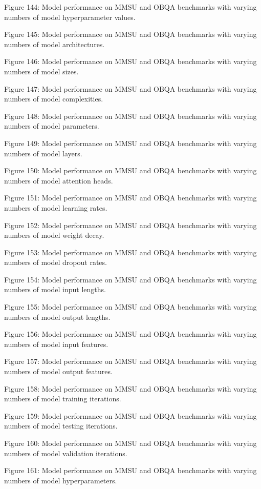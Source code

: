         Figure 144: Model performance on MMSU and OBQA benchmarks with varying numbers of model hyperparameter values.

        Figure 145: Model performance on MMSU and OBQA benchmarks with varying numbers of model architectures.

        Figure 146: Model performance on MMSU and OBQA benchmarks with varying numbers of model sizes.

        Figure 147: Model performance on MMSU and OBQA benchmarks with varying numbers of model complexities.

        Figure 148: Model performance on MMSU and OBQA benchmarks with varying numbers of model parameters.

        Figure 149: Model performance on MMSU and OBQA benchmarks with varying numbers of model layers.

        Figure 150: Model performance on MMSU and OBQA benchmarks with varying numbers of model attention heads.

        Figure 151: Model performance on MMSU and OBQA benchmarks with varying numbers of model learning rates.

        Figure 152: Model performance on MMSU and OBQA benchmarks with varying numbers of model weight decay.

        Figure 153: Model performance on MMSU and OBQA benchmarks with varying numbers of model dropout rates.

        Figure 154: Model performance on MMSU and OBQA benchmarks with varying numbers of model input lengths.

        Figure 155: Model performance on MMSU and OBQA benchmarks with varying numbers of model output lengths.

        Figure 156: Model performance on MMSU and OBQA benchmarks with varying numbers of model input features.

        Figure 157: Model performance on MMSU and OBQA benchmarks with varying numbers of model output features.

        Figure 158: Model performance on MMSU and OBQA benchmarks with varying numbers of model training iterations.

        Figure 159: Model performance on MMSU and OBQA benchmarks with varying numbers of model testing iterations.

        Figure 160: Model performance on MMSU and OBQA benchmarks with varying numbers of model validation iterations.

        Figure 161: Model performance on MMSU and OBQA benchmarks with varying numbers of model hyperparameters.

